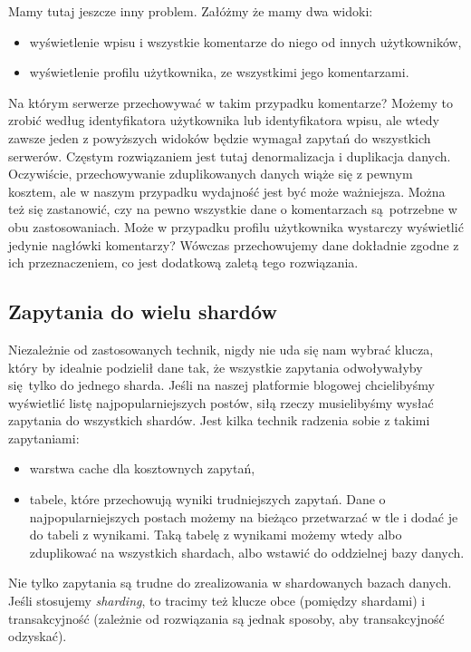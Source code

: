 \documentclass[a4paper,12pt]{article}
\begin{document}
Mamy tutaj jeszcze inny problem. Załóżmy że mamy dwa widoki:
\begin{itemize}
 \setlength{\itemsep}{0.06cm}
 \setlength{\parskip}{0.06cm}
 \item wyświetlenie wpisu i wszystkie komentarze do niego od innych użytkowników,
 \item wyświetlenie profilu użytkownika, ze wszystkimi jego komentarzami.
\end{itemize}
Na którym serwerze przechowywać w takim przypadku komentarze? Możemy to zrobić według identyfikatora użytkownika lub identyfikatora wpisu, ale wtedy zawsze jeden z powyższych widoków będzie wymagał zapytań do wszystkich serwerów. Częstym rozwiązaniem jest tutaj denormalizacja i duplikacja danych. Oczywiście, przechowywanie zduplikowanych danych wiąże się z pewnym kosztem, ale w naszym przypadku wydajność jest być może ważniejsza. Można też się zastanowić, czy na pewno wszystkie dane o komentarzach są~potrzebne w obu zastosowaniach. Może w przypadku profilu użytkownika wystarczy wyświetlić jedynie nagłówki komentarzy? Wówczas przechowujemy dane dokładnie zgodne z ich przeznaczeniem, co jest dodatkową zaletą tego rozwiązania.

\subsection{Zapytania do wielu shardów}

Niezależnie od zastosowanych technik, nigdy nie uda się nam wybrać klucza, który by idealnie podzielił dane tak, że wszystkie zapytania odwoływałyby się tylko do jednego sharda. Jeśli na naszej platformie blogowej chcielibyśmy wyświetlić listę najpopularniejszych postów, siłą rzeczy musielibyśmy wysłać zapytania do wszystkich shardów. Jest kilka technik radzenia sobie z takimi zapytaniami:
\begin{itemize}
 \setlength{\itemsep}{0.06cm}
 \setlength{\parskip}{0.06cm}
 \item warstwa cache dla kosztownych zapytań,
 \item tabele, które przechowują wyniki trudniejszych zapytań. Dane o najpopularniejszych postach możemy na bieżąco przetwarzać w tle i dodać je do tabeli z wynikami. Taką tabelę z wynikami możemy wtedy albo zduplikować na wszystkich shardach, albo wstawić do oddzielnej bazy danych.
\end{itemize}

Nie tylko zapytania są trudne do zrealizowania w shardowanych bazach danych. Jeśli stosujemy \textit{sharding}, to tracimy też klucze obce (pomiędzy shardami) i transakcyjność (zależnie od rozwiązania są jednak sposoby, aby transakcyjność odzyskać).
\end{document}
